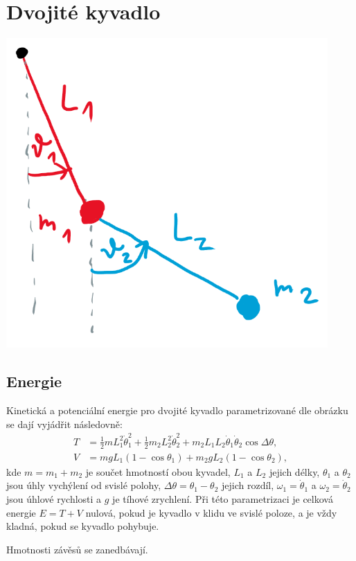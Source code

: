 \documentclass{article}
\begin{document}
\section{Dvojité kyvadlo}
    \begin{center}
        \includegraphics[width=0.495\linewidth]{dvojkyvadlo.png}
    \end{center}
    \subsection{Energie}
    Kinetická a potenciální energie pro dvojité kyvadlo parametrizované dle obrázku se dají vyjádřit následovně:
    \begin{align}
        T &= \frac{1}{2} m L_1^2 \dot{\theta}_1^2 + \frac{1}{2} m_2 L_2^2 \dot{\theta}_2^2 + m_{2} L_1 L_2 \dot{\theta}_1 \dot{\theta}_2 \cos\Delta\theta, \\
        V &= m g L_1 (1 - \cos \theta_1) + m_2 g L_2 (1 - \cos \theta_2),
    \end{align}
    kde $m=m_1+m_2$ je součet hmotností obou kyvadel, $L_1$ a $L_2$ jejich délky, $\theta_1$ a $\theta_2$ jsou úhly vychýlení od svislé polohy, $\Delta\theta=\theta_{1}-\theta_{2}$ jejich rozdíl, $\omega_{1}=\dot{\theta}_1$ a $\omega_{2}=\dot{\theta}_2$ jsou úhlové rychlosti a $g$ je tíhové zrychlení.
    Při této parametrizaci je celková energie $E=T+V$ nulová, pokud je kyvadlo v klidu ve svislé poloze, a je vždy kladná, pokud se kyvadlo pohybuje.

    Hmotnosti závěsů se zanedbávají.
\end{document}
